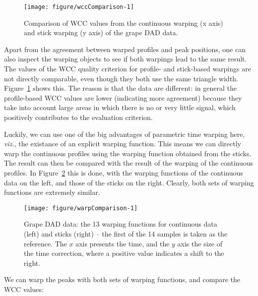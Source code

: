 \documentclass[a4paper,11pt]{article}\usepackage[]{graphicx}\usepackage[]{color}
\newenvironment{knitrout}{}{} %
\begin{document}
\begin{figure}[tb]
  \centering
\begin{knitrout}\small
{}\color{fgcolor}
\texttt{[image: figure/wccComparison-1]} 
\end{knitrout}
\caption{Comparison of WCC values from the continuous warping (x axis)
and stick warping (y axis) of the grape DAD data.}
\label{fig:wccComparison}
\end{figure}

Apart from the agreement between warped profiles and peak positions,
one can also inspect the warping objects to see if both warpings lead
to the same result. The values of the WCC quality criterion for
profile- and stick-based warpings are not directly comparable, even
though they both use the same triangle
width. Figure~\ref{fig:wccComparison} shows this. The reason is that
the data are different: in general the profile-based WCC values are
lower (indicating more agreement) because they take into account large
areas in which there is no or very little signal, which positively
contributes to the evaluation criterion.

Luckily, we can use one of the big advantages of parametric time
warping here, \emph{viz.}, the existance of an explicit warping
function. This 
means we can directly warp the continuous profiles using the warping
function obtained from the sticks. The result can then be compared
with the result of the warping of the continuous profiles. In
Figure~\ref{fig:warpComparison} this is done, with the warping
functions of the continuous data on the left, and those of the sticks
on the right. Clearly, both sets of warping functions are extremely similar.

\begin{figure}[bt]
  \centering
\begin{knitrout}\small
{}\color{fgcolor}
\texttt{[image: figure/warpComparison-1]} 
\end{knitrout}
\caption{Grape DAD data: the 13 warping functions for continuous data
  (left) and sticks (right) -- the first of the 14 samples is taken as
  the reference. The $x$ axis presents the time, and the
  $y$ axis the size of the time correction, where a positive value
  indicates a shift to the right.}
\label{fig:warpComparison}
\end{figure}

We can warp the peaks with both sets of warping functions, and compare
the WCC values:
\end{document}
